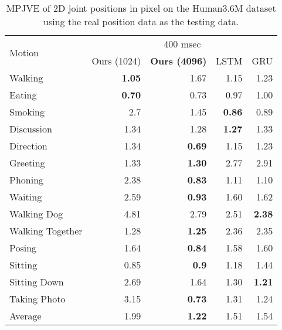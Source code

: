 \begin{table}
    \centering
    \caption{MPJVE of 2D joint positions in pixel on the Human3.6M dataset using the real position data as the testing data.}
    \begin{tabular}{l|rrrr}
        \toprule
        \multirow{2}{*}{Motion}  & \multicolumn{4}{c}{400 msec} \\
            & Ours (1024) & \textbf{Ours (4096)} & LSTM & GRU \\
        \midrule
Walking	&	\textbf{1.05}	&	1.67	&	1.15	&	1.23	 \\
Eating	&	\textbf{0.70}	&	0.73	&	0.97	&	1.00	\\
Smoking	&	2.7	&	1.45	&	\textbf{0.86}	&	0.89	 \\
Discussion	&	1.34	&	1.28	&	\textbf{1.27}	&	1.33	\\
Direction	&	1.34	&	\textbf{0.69}	&	1.15	&	1.23	\\
Greeting	&	1.33	&	\textbf{1.30}	&	2.77	&	2.91	 \\
Phoning	&	2.38	&	\textbf{0.83}	&	1.11	&	1.10	 \\
Waiting	&	2.59	&	\textbf{0.93}	&	1.60	&	1.62	 \\
Walking Dog	&	4.81	&	2.79	&	2.51	&	\textbf{2.38}	\\
Walking Together	&	1.28	&	\textbf{1.25}	&	2.36	&	2.35	 \\
Posing	&	1.64	&	\textbf{0.84}	&	1.58	&	1.60	\\
Sitting	&	0.85	&	\textbf{0.9}	&	1.18	&	1.44	\\
Sitting Down	&	2.69	&	1.64	&	1.30	&	\textbf{1.21}	 \\
Taking Photo	&	3.15	&	\textbf{0.73}	&	1.31	&	1.24	 \\

        \midrule
        Average	&	1.99	&	\textbf{1.22}	&	1.51	&	1.54	\\
        \bottomrule
    \end{tabular}
    \label{tbl:2DMPJVE_gt_short}
\end{table}


